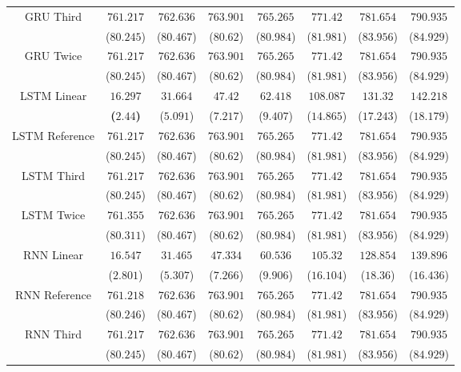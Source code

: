 \begin{table}[!ht]
{\begin{tabular}{|c|c|c|c|c|c|c|c|}
			\multirow{2}{*}{GRU Third} & $761.217$ & $762.636$ & $763.901$ & $765.265$ & $771.42$ & $781.654$ & $790.935$ \\
			 & ($80.245$) & ($80.467$) & ($80.62$) & ($80.984$) & ($81.981$) & ($83.956$) & ($84.929$) \\ \hline
			\multirow{2}{*}{GRU Twice} & $761.217$ & $762.636$ & $763.901$ & $765.265$ & $771.42$ & $781.654$ & $790.935$ \\
			 & ($80.245$) & ($80.467$) & ($80.62$) & ($80.984$) & ($81.981$) & ($83.956$) & ($84.929$) \\ \hline
			\multirow{2}{*}{LSTM Linear} & $\mathbf{16.297}$ & $31.664$ & $47.42$ & $62.418$ & $108.087$ & $131.32$ & $142.218$ \\
			 & \textbf{(}$\mathbf{2.44}$\textbf{)} & ($5.091$) & ($7.217$) & ($9.407$) & ($14.865$) & ($17.243$) & ($18.179$) \\ \hline
			\multirow{2}{*}{LSTM Reference} & $761.217$ & $762.636$ & $763.901$ & $765.265$ & $771.42$ & $781.654$ & $790.935$ \\
			 & ($80.245$) & ($80.467$) & ($80.62$) & ($80.984$) & ($81.981$) & ($83.956$) & ($84.929$) \\ \hline
			\multirow{2}{*}{LSTM Third} & $761.217$ & $762.636$ & $763.901$ & $765.265$ & $771.42$ & $781.654$ & $790.935$ \\
			 & ($80.245$) & ($80.467$) & ($80.62$) & ($80.984$) & ($81.981$) & ($83.956$) & ($84.929$) \\ \hline
			\multirow{2}{*}{LSTM Twice} & $761.355$ & $762.636$ & $763.901$ & $765.265$ & $771.42$ & $781.654$ & $790.935$ \\
			 & ($80.311$) & ($80.467$) & ($80.62$) & ($80.984$) & ($81.981$) & ($83.956$) & ($84.929$) \\ \hline
			\multirow{2}{*}{RNN Linear} & $16.547$ & $31.465$ & $47.334$ & $60.536$ & $105.32$ & $128.854$ & $139.896$ \\
			 & ($2.801$) & ($5.307$) & ($7.266$) & ($9.906$) & ($16.104$) & ($18.36$) & ($16.436$) \\ \hline
			\multirow{2}{*}{RNN Reference} & $761.218$ & $762.636$ & $763.901$ & $765.265$ & $771.42$ & $781.654$ & $790.935$ \\
			 & ($80.246$) & ($80.467$) & ($80.62$) & ($80.984$) & ($81.981$) & ($83.956$) & ($84.929$) \\ \hline
			\multirow{2}{*}{RNN Third} & $761.217$ & $762.636$ & $763.901$ & $765.265$ & $771.42$ & $781.654$ & $790.935$ \\
			 & ($80.245$) & ($80.467$) & ($80.62$) & ($80.984$) & ($81.981$) & ($83.956$) & ($84.929$) \\ \hline

\end{tabular}}
\end{table}
